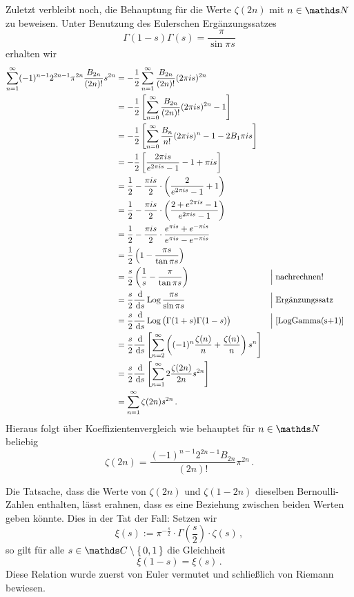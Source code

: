 \begin{bewe}
Zuletzt verbleibt noch, die Behauptung für die Werte $\zeta(2n)$ mit $n \in \NN$ zu beweisen. Unter Benutzung des Eulerschen Ergänzungssatzes
\[
	\Gamma(1-s) \Gamma(s) = \frac \pi{\sin \pi s}
\]
erhalten wir
\begin{align*}
	\sum_{n=1}^\infty (-1)^{n-1} 2^{2n-1} \pi^{2n} \frac {B_{2n}}{(2n)!} s^{2n}
	&= - \frac 12 \sum_{n=1}^\infty \frac {B_{2n}}{(2n)!} (2\pi is)^{2n} \\
	&= - \frac 12 \left[ \sum_{n=0}^\infty \frac {B_{2n}}{(2n)!} (2\pi is)^{2n} - 1 \right] \\
	&= - \frac 12 \left[ \sum_{n=0}^\infty \frac {B_n}{n!} (2\pi is)^n - 1 - 2 B_1 \pi i s \right] \\
	&= - \frac 12 \left[ \frac {2\pi is}{e^{2\pi is} - 1} - 1 + \pi is \right] \\
	&= \frac 12 - \frac {\pi is}2 \cdot \left( \frac 2{e^{2\pi is} - 1} + 1 \right) \\
	&= \frac 12 - \frac {\pi is}2 \cdot \left( \frac {2 + e^{2\pi is} - 1}{e^{2\pi is} - 1} \right) \\
	&= \frac 12 - \frac {\pi is}2 \cdot \frac {e^{\pi is} + e^{-\pi is}}{e^{\pi is} - e^{-\pi is}} \\
	&= \frac 12 \left( 1 - \frac {\pi s}{\tan \pi s} \right) \\
	&= \frac s2 \left( \frac 1s - \frac \pi{\tan \pi s} \right) && \Big| \; \text{nachrechnen!} \\
	&= \frac s2 \frac {\opd}{\opd s} \Log \frac {\pi s}{\sin \pi s} && \Big| \; \text{Ergänzungssatz} \\
	&= \frac s2 \frac {\opd}{\opd s} \Log \big( \Gamma(1+s) \Gamma(1-s) \big) && \Big| \; \text{\autoref{LogGamma(s+1)}} \\
	&= \frac s2 \frac {\opd}{\opd s} \left[ \sum_{n=2}^\infty \left( (-1)^n \frac {\zeta(n)}n + \frac {\zeta(n)}n \right) s^n \right] \\
	&= \frac s2 \frac {\opd}{\opd s} \left[ \sum_{n=1}^\infty 2\frac {\zeta(2n)}{2n} s^{2n} \right] \\
	&= \sum_{n=1}^\infty \zeta(2n) s^{2n}
	\,.
\end{align*}
Hieraus folgt über Koeffizientenvergleich wie behauptet für $n \in \NN$ beliebig
\[
	\zeta(2n) = \frac {(-1)^{n-1} 2^{2n-1} B_{2n}}{(2n)!} \pi^{2n} 
	\,.
\]
\end{bewe}

Die Tatsache, dass die Werte von $\zeta(2n)$ und $\zeta(1-2n)$ dieselben Bernoulli-Zahlen enthalten, lässt erahnen, dass es eine Beziehung zwischen beiden Werten geben könnte. Dies in der Tat der Fall: Setzen wir 
\[
	\xi(s) := \pi^{- \frac s2} \cdot \Gamma \! \left( \frac s2 \right) \cdot \zeta(s)
	\,,
\]
so gilt für alle $s \in \CC \setminus \Set {0,1}$ die Gleichheit
\begin{equation}\label{eq:Xi-Beziehung}
	\xi(1-s) = \xi(s)
	\,.
\end{equation}
Diese Relation wurde zuerst von Euler vermutet und schließlich von Riemann bewiesen.

